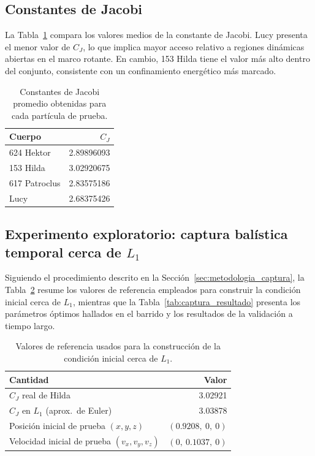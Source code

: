 \documentclass[12pt,a4paper]{article}
\begin{document}
\subsection{Constantes de Jacobi}
La Tabla~\ref{tab:jacobi} compara los valores medios de la constante de Jacobi. Lucy presenta el menor valor de \(C_J\), lo que implica mayor acceso relativo a regiones dinámicas abiertas en el marco rotante. En cambio, 153 Hilda tiene el valor más alto dentro del conjunto, consistente con un confinamiento energético más marcado.

\begin{table}[H]
\centering
\caption{Constantes de Jacobi promedio obtenidas para cada partícula de prueba.}
\label{tab:jacobi}
\begin{tabular}{lr}
\toprule
\textbf{Cuerpo} & \(C_J\) \\
\midrule
624 Hektor & 2.89896093 \\
153 Hilda & 3.02920675 \\
617 Patroclus & 2.83575186 \\
Lucy & 2.68375426 \\
\bottomrule
\end{tabular}
\end{table}

\subsection{Experimento exploratorio: captura balística temporal cerca de \texorpdfstring{\(L_1\)}{L1}}
\label{sec:captura}
Siguiendo el procedimiento descrito en la Sección~\ref{sec:metodologia_captura}, la Tabla~\ref{tab:captura_ref} resume los valores de referencia empleados para construir la condición inicial cerca de \(L_1\), mientras que la Tabla~\ref{tab:captura_resultado} presenta los parámetros óptimos hallados en el barrido y los resultados de la validación a tiempo largo.

\begin{table}[H]
\centering
\caption{Valores de referencia usados para la construcción de la condición inicial cerca de \(L_1\).}
\label{tab:captura_ref}
\begin{tabular}{lr}
\toprule
\textbf{Cantidad} & \textbf{Valor} \\
\midrule
\(C_J\) real de Hilda & 3.02921 \\
\(C_J\) en \(L_1\) (aprox.\ de Euler) & 3.03878 \\
Posición inicial de prueba \((x,y,z)\) & \((0.9208,\ 0,\ 0)\) \\
Velocidad inicial de prueba \((v_x,v_y,v_z)\) & \((0,\ 0.1037,\ 0)\) \\
\bottomrule
\end{tabular}
\end{table}
\end{document}
